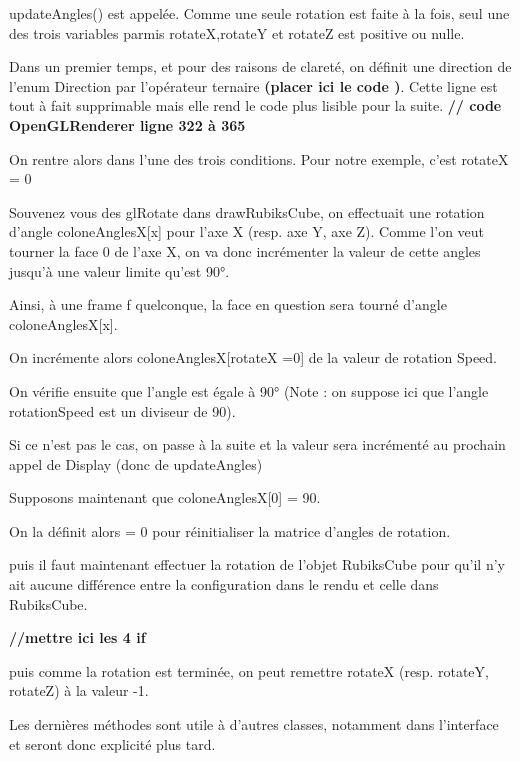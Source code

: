updateAngles() est appelée. Comme une seule rotation est faite à la fois, seul une des trois variables parmis rotateX,rotateY et rotateZ est positive ou nulle.

Dans un premier temps, et pour des raisons de clareté, on définit une direction de l’enum Direction par l’opérateur ternaire \textbf{(placer ici le code )}. Cette ligne est tout à fait supprimable mais elle rend le code plus lisible pour la suite.
\textbf{// 	code OpenGLRenderer ligne 322 à 365}

On rentre alors dans l’une des trois conditions. Pour notre exemple, c’est rotateX = 0

Souvenez vous des glRotate dans drawRubiksCube, on effectuait une rotation d’angle coloneAnglesX[x] pour l’axe X (resp. axe Y, axe Z). Comme l’on veut tourner la face 0 de l’axe X, on va donc incrémenter la valeur de cette angles jusqu’à une valeur limite qu’est 90°.

Ainsi, à une frame f quelconque, la face en question sera tourné d’angle coloneAnglesX[x].

On incrémente alors coloneAnglesX[rotateX =0] de la valeur de rotation Speed.

On vérifie ensuite que l’angle est égale à 90° (Note : on suppose ici que l’angle rotationSpeed est un diviseur de 90).

Si ce n’est pas le cas, on passe à la suite et la valeur sera incrémenté au prochain appel de Display (donc de updateAngles)

Supposons maintenant que coloneAnglesX[0] = 90.

On la définit alors = 0 pour réinitialiser la matrice d’angles de rotation.

puis il faut maintenant effectuer la rotation de l’objet RubiksCube pour qu’il n’y ait aucune différence entre la configuration dans le rendu et celle dans RubiksCube.

\textbf{//mettre ici les 4 if}

puis comme la rotation est terminée, on peut remettre rotateX (resp. rotateY, rotateZ)  à la valeur -1.

Les dernières méthodes sont utile à d’autres classes, notamment dans l’interface et seront donc explicité plus tard.


